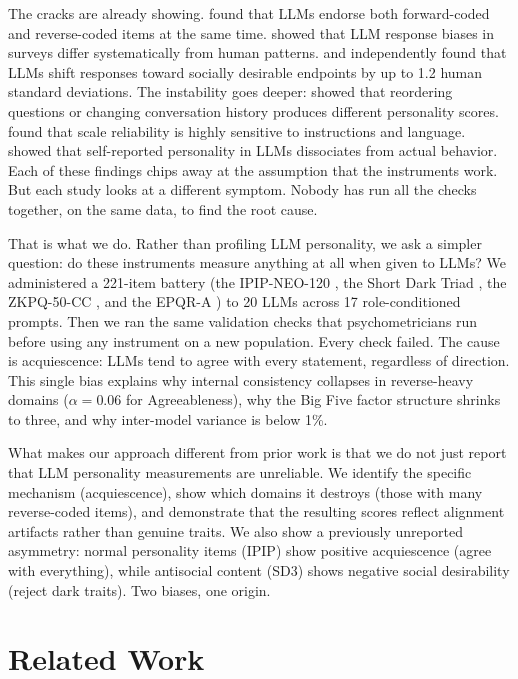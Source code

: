 \documentclass[11pt]{article}
\begin{document}
The cracks are already showing. \citet{suhr2025challenging} found that LLMs endorse both forward-coded and reverse-coded items at the same time. \citet{tjuatja2023response} showed that LLM response biases in surveys differ systematically from human patterns. \citet{acerbi2024llm} and \citet{salecha2024llm} independently found that LLMs shift responses toward socially desirable endpoints by up to 1.2 human standard deviations. The instability goes deeper: \citet{pelet2025persistent} showed that reordering questions or changing conversation history produces different personality scores. \citet{huang2024reliability} found that scale reliability is highly sensitive to instructions and language. \citet{han2025personality} showed that self-reported personality in LLMs dissociates from actual behavior. Each of these findings chips away at the assumption that the instruments work. But each study looks at a different symptom. Nobody has run all the checks together, on the same data, to find the root cause.

That is what we do. Rather than profiling LLM personality, we ask a simpler question: do these instruments measure anything at all when given to LLMs? We administered a 221-item battery (the IPIP-NEO-120 \citep{johnson2014measuring}, the Short Dark Triad \citep{jones2014introducing}, the ZKPQ-50-CC \citep{aluja2006cross}, and the EPQR-A \citep{francis1992development}) to 20 LLMs across 17 role-conditioned prompts. Then we ran the same validation checks that psychometricians run before using any instrument on a new population. Every check failed. The cause is acquiescence: LLMs tend to agree with every statement, regardless of direction. This single bias explains why internal consistency collapses in reverse-heavy domains ($\alpha = 0.06$ for Agreeableness), why the Big Five factor structure shrinks to three, and why inter-model variance is below 1\%.

What makes our approach different from prior work is that we do not just report that LLM personality measurements are unreliable. We identify the specific mechanism (acquiescence), show which domains it destroys (those with many reverse-coded items), and demonstrate that the resulting scores reflect alignment artifacts rather than genuine traits. We also show a previously unreported asymmetry: normal personality items (IPIP) show positive acquiescence (agree with everything), while antisocial content (SD3) shows negative social desirability (reject dark traits). Two biases, one origin.

\section{Related Work}
\end{document}
